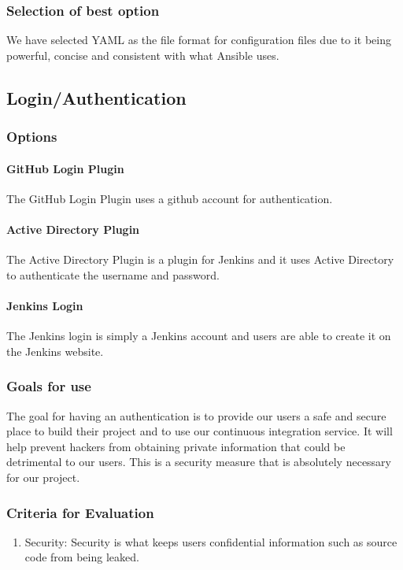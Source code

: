 \documentclass[10pt,letterpaper,onecolumn,draftclsnofoot]{IEEEtran}
\begin{document}
\subsubsection{Selection of best option}
We have selected YAML as the file format for configuration files due to it being powerful, concise and consistent with what Ansible uses.

\subsection{Login/Authentication}
\subsubsection{Options}
\paragraph{GitHub Login Plugin}
The GitHub Login Plugin uses a github account for authentication.
\paragraph{Active Directory Plugin}
The Active Directory Plugin is a plugin for Jenkins and it uses Active Directory to authenticate the username and password.
\paragraph{Jenkins Login}
The Jenkins login is simply a Jenkins account and users are able to create it on the Jenkins website.
\subsubsection{Goals for use}
The goal for having an authentication is to provide our users a safe and secure place to build their project and to use our continuous integration service.
It will help prevent hackers from obtaining private information that could be detrimental to our users.
This is a security measure that is absolutely necessary for our project.
\subsubsection{Criteria for Evaluation}
\begin{enumerate}
  \item Security: Security is what keeps users confidential information such as source code from being leaked.
\end{enumerate}
\end{document}

